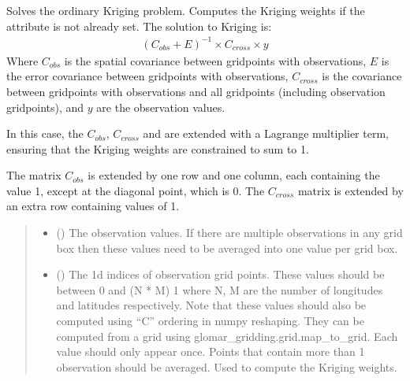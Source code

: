 \documentclass[letterpaper,10pt,english]{sphinxmanual}
\begin{document}
\begin{fulllineitems}

\begin{fulllineitems}
\label{\detokenize{kriging:glomar_gridding.kriging.OrdinaryKriging.solve}}
\pysigstartsignatures
\pysiglinewithargsret
{}
{\sphinxparamcomma {}\sphinxparamcomma {}}
{}
\pysigstopsignatures
\sphinxAtStartPar
Solves the ordinary Kriging problem. Computes the Kriging weights if the
 attribute is not already set. The solution to Kriging
is:
\begin{equation*}
\begin{split}(C_{obs} + E)^{-1} \times C_{cross} \times y\end{split}
\end{equation*}
\sphinxAtStartPar
Where \(C_{obs}\) is the spatial covariance between grid\sphinxhyphen{}points
with observations, \(E\) is the error covariance between grid\sphinxhyphen{}points
with observations, \(C_{cross}\) is the covariance between
grid\sphinxhyphen{}points with observations and all grid\sphinxhyphen{}points (including observation
grid\sphinxhyphen{}points), and \(y\) are the observation values.

\sphinxAtStartPar
In this case, the \(C_{obs}\), \(C_{cross}\) and are extended
with a Lagrange multiplier term, ensuring that the Kriging weights are
constrained to sum to 1.

\sphinxAtStartPar
The matrix \(C_{obs}\) is extended by one row and one column, each
containing the value 1, except at the diagonal point, which is 0. The
\(C_{cross}\) matrix is extended by an extra row containing values
of 1.
\begin{quote}\begin{description}
\begin{itemize}
\item {}
\sphinxAtStartPar
{} () \textendash{} The observation values. If there are multiple observations in any
grid box then these values need to be averaged into one value per
grid box.

\item {}
\sphinxAtStartPar
{} () \textendash{} The 1d indices of observation grid points. These values should be
between 0 and (N * M) \sphinxhyphen{} 1 where N, M are the number of longitudes
and latitudes respectively. Note that these values should also be
computed using “C” ordering in numpy reshaping. They can be
computed from a grid using glomar\_gridding.grid.map\_to\_grid. Each
value should only appear once. Points that contain more than 1
observation should be averaged. Used to compute the Kriging weights.


\end{itemize}
\end{description}
\end{quote}
\end{fulllineitems}
\end{fulllineitems}
\end{document}
